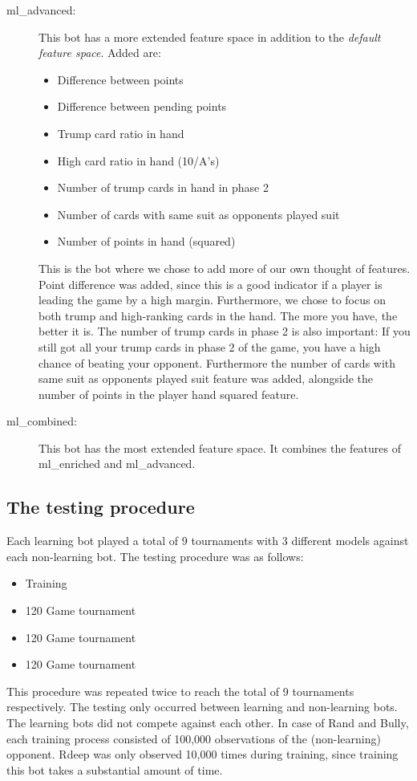 \documentclass[a4paper,11pt]{article}
\begin{document}
\begin{description}
\item [ml\_advanced:] 
This bot has a more extended feature space in addition to the \textit{default feature space}. Added are: 
\begin{itemize}
\item Difference between points
\item Difference between pending points
\item Trump card ratio in hand
\item High card ratio in hand (10/A's)
\item Number of trump cards in hand in phase 2
\item Number of cards with same suit as opponents played suit
\item Number of points in hand (squared)
\end{itemize}
This is the bot where we chose to add more of our own thought of features. Point difference was added, since this is a good indicator if a player is leading the game by a high margin. Furthermore, we chose to focus on both trump and high-ranking cards in the hand. The more you have, the better it is. The number of trump cards in phase 2 is also important: If you still got all your trump cards in phase 2 of the game, you have a high chance of beating your opponent. Furthermore the number of cards with same suit as opponents played suit feature was added, alongside the number of points in the player hand squared feature.

\item[ml\_combined:] This bot has the most extended feature space. It combines the features of ml\_enriched and ml\_advanced.
\end{description}
\subsection{The testing procedure}

Each learning bot played a total of 9 tournaments with 3 different models against each non-learning bot.
The testing procedure was as follows:
\begin{itemize}
\item Training
\item 120 Game tournament
\item 120 Game tournament
\item 120 Game tournament
\end{itemize}

This procedure was repeated twice to reach the total of 9 tournaments respectively. The testing only occurred between learning and non-learning bots.  The learning bots did not compete against each other.  In case of Rand and Bully, each training process consisted of 100,000 observations of the (non-learning) opponent. Rdeep was only observed 10,000 times during training, since training this bot takes a substantial amount of time.
\clearpage
\end{document}
